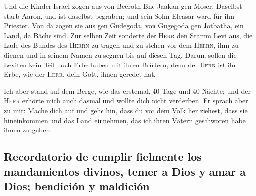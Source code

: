 Und die Kinder Israel zogen aus von Beeroth-Bne-Jaakan
gen Moser. Daselbst starb Aaron, und ist daselbst begraben; und sein
Sohn Eleasar ward für ihn Priester.  Von da zogen sie aus
gen Gudegoda, von Gugegoda gen Jotbatha, ein Land, da Bäche sind.
 Zur selben Zeit sonderte der \textsc{Herr} den Stamm Levi
aus, die Lade des Bundes des \textsc{Herrn} zu tragen und zu stehen vor
dem \textsc{Herrn}, ihm zu dienen und in seinem Namen zu segnen bis auf
diesen Tag.  Darum sollen die Leviten kein Teil noch Erbe
haben mit ihren Brüdern; denn der \textsc{Herr} ist ihr Erbe, wie der
\textsc{Herr}, dein Gott, ihnen geredet hat.

 Ich aber stand auf dem Berge, wie das erstemal, 40 Tage
und 40 Nächte; und der \textsc{Herr} erhörte mich auch dasmal und wollte
dich nicht verderben.  Er sprach aber zu mir: Mache dich
auf und gehe hin, dass du vor dem Volk her ziehest, dass sie
hineinkommen und das Land einnehmen, das ich ihren Vätern geschworen
habe ihnen zu geben.

\hypertarget{recordatorio-de-cumplir-fielmente-los-mandamientos-divinos-temer-a-dios-y-amar-a-dios-bendiciuxf3n-y-maldiciuxf3n}{%
\subsection{Recordatorio de cumplir fielmente los mandamientos divinos,
temer a Dios y amar a Dios; bendición y
maldición}\label{recordatorio-de-cumplir-fielmente-los-mandamientos-divinos-temer-a-dios-y-amar-a-dios-bendiciuxf3n-y-maldiciuxf3n}}


